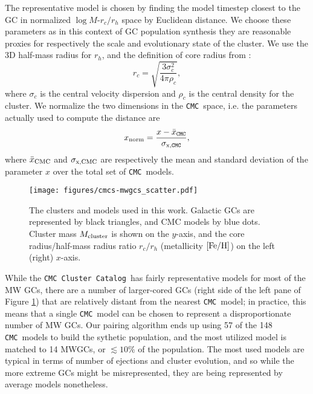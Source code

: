 \documentclass[twocolumn]{aastex631}
\newcommand{\CMC}{\texttt{CMC}}
\newcommand{\CMCcat}{\texttt{CMC Cluster Catalog}}
\begin{document}
The representative model is chosen by finding the model timestep closest to the GC in normalized $\log M$-$r_c / r_h$ space by Euclidean distance.
We choose these parameters as in this context of GC population synthesis they are reasonable proxies for respectively the scale and evolutionary state of the cluster.
We use the 3D half-mass radius for $r_h$, and the definition of core radius from \citet{1987degc.book.....S}:
\begin{equation}
    r_c = \sqrt{\frac{3 \sigma_c^2}{4 \pi \rho_c}},
\end{equation}
where $\sigma_c$ is the central velocity dispersion and $\rho_c$ is the central density for the cluster.
We normalize the two dimensions in the \CMC\ space, i.e. the parameters actually used to compute the distance are
\begin{equation}
    x_{\rm norm} = \frac{x - \bar{x}_{\rm \CMC}}{\sigma_{\rm x, \CMC}},
\end{equation}
where $\bar{x}_{\rm CMC}$ and $\sigma_{\rm x,CMC}$ are respectively the mean and standard deviation of the parameter $x$ over the total set of \CMC\ models.

\begin{figure}
    \begin{centering}
        \texttt{[image: figures/cmcs-mwgcs\_scatter.pdf]}
        \caption{
        The clusters and models used in this work.
        Galactic GCs are represented by black triangles, and CMC models by blue dots.
        Cluster mass $M_{\rm cluster}$ is shown on the $y$-axis, and the core radius/half-mass radius ratio $r_c/r_h$ (metallicity $[{\rm Fe/H}]$) on the left (right) $x$-axis.
        }
        \label{fig:cmcs-mwgcs_scatter}
    \end{centering}
\end{figure}

While the \CMCcat\ has fairly representative models for most of the MW GCs, there are a number of larger-cored GCs (right side of the left pane of Figure \ref{fig:cmcs-mwgcs_scatter}) that are relatively distant from the nearest \CMC\ model; in practice, this means that a single \CMC\ model can be chosen to represent a disproportionate number of MW GCs.
Our pairing algorithm ends up using 57 of the 148 \CMC\ models to build the sythetic population, and the most utilized model is matched to 14 MWGCs, or $\lesssim10\%$ of the population.
The most used models are typical in terms of number of ejections and cluster evolution, and so while the more extreme GCs might be misrepresented, they are being represented by average models nonetheless.
\end{document}
